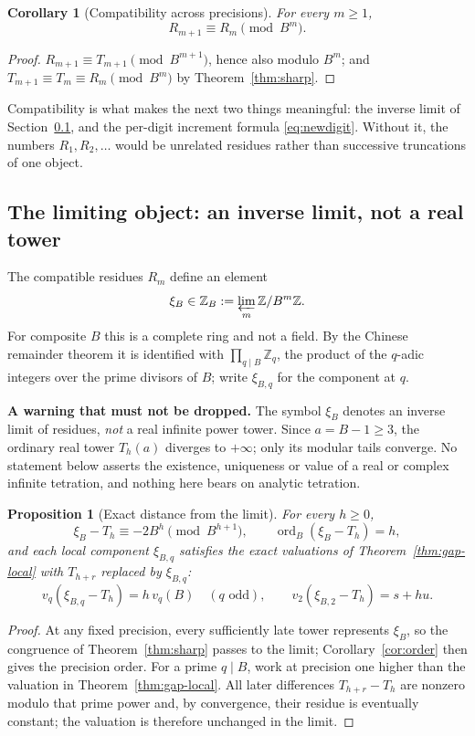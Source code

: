 \documentclass[11pt,letterpaper]{article}
\numberwithin{equation}{section}
\newtheorem{proposition}[theorem]{Proposition}
\newtheorem{corollary}[theorem]{Corollary}
\theoremstyle{definition}
\theoremstyle{remark}
\newcommand{\Z}{\mathbb Z}
\DeclareMathOperator{\ordop}{ord}
\newcommand{\panel}[1]{\noindent\colorbox{pale}{\parbox{0.95\textwidth}{\small #1}}}
\begin{document}
\begin{corollary}[Compatibility across precisions]\label{cor:compatibility}
For every $m\ge1$,
\begin{equation}\label{eq:compatibility}
 R_{m+1}\equiv R_m\pmod{B^m}.
\end{equation}
\end{corollary}
\begin{proof}
$R_{m+1}\equiv T_{m+1}\pmod{B^{m+1}}$, hence also modulo $B^m$; and $T_{m+1}\equiv T_m\equiv R_m\pmod{B^m}$ by Theorem~\ref{thm:sharp}.
\end{proof}

Compatibility is what makes the next two things meaningful: the inverse limit of Section~\ref{sec:limit}, and the per-digit increment formula \eqref{eq:newdigit}. Without it, the numbers $R_1,R_2,\ldots$ would be unrelated residues rather than successive truncations of one object.

\subsection{The limiting object: an inverse limit, not a real tower}\label{sec:limit}

The compatible residues $R_m$ define an element
\[
 \xi_B\in\Z_B:=\varprojlim_m\Z/B^m\Z.
\]
For composite $B$ this is a complete ring and not a field. By the Chinese remainder theorem it is identified with $\prod_{q\mid B}\Z_q$, the product of the $q$-adic integers over the prime divisors of $B$; write $\xi_{B,q}$ for the component at $q$.

\panel{\textbf{A warning that must not be dropped.} The symbol $\xi_B$ denotes an inverse limit of residues, \emph{not} a real infinite power tower. Since $a=B-1\ge3$, the ordinary real tower $T_h(a)$ diverges to $+\infty$; only its modular tails converge. No statement below asserts the existence, uniqueness or value of a real or complex infinite tetration, and nothing here bears on analytic tetration.}

\begin{proposition}[Exact distance from the limit]\label{prop:limit-error}
For every $h\ge0$,
\begin{equation}\label{eq:limit-leading}
 \xi_B-T_h\equiv-2B^h\pmod{B^{h+1}},
 \qquad \ordop_B(\xi_B-T_h)=h,
\end{equation}
and each local component $\xi_{B,q}$ satisfies the exact valuations of Theorem~\ref{thm:gap-local} with $T_{h+r}$ replaced by $\xi_{B,q}$:
\[
 v_q(\xi_{B,q}-T_h)=h\,v_q(B)\quad(q\text{ odd}),
 \qquad v_2(\xi_{B,2}-T_h)=s+hu.
\]
\end{proposition}
\begin{proof}
At any fixed precision, every sufficiently late tower represents $\xi_B$, so the congruence of Theorem~\ref{thm:sharp} passes to the limit; Corollary~\ref{cor:order} then gives the precision order. For a prime $q\mid B$, work at precision one higher than the valuation in Theorem~\ref{thm:gap-local}. All later differences $T_{h+r}-T_h$ are nonzero modulo that prime power and, by convergence, their residue is eventually constant; the valuation is therefore unchanged in the limit.
\end{proof}
\end{document}
